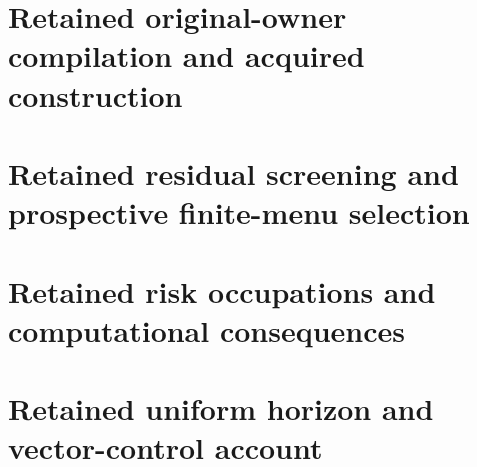 \documentclass[ecta,nameyear,draft]{econsocart}
\begin{document}
\section{Retained original-owner compilation and acquired construction}\label{dev:core110}

\section{Retained residual screening and prospective finite-menu selection}\label{dev:selection110}












\section{Retained risk occupations and computational consequences}\label{sec:riskextensions99}

\section{Retained uniform horizon and vector-control account}\label{sec:horizonextensions99}






























































\end{document}
